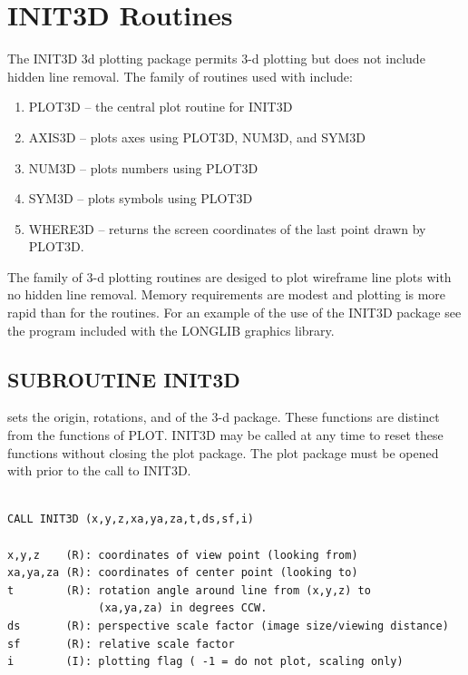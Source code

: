 \documentclass[11pt]{report}
\begin{document}
\section{INIT3D Routines}

The INIT3D 3d plotting package permits 3-d plotting but does not include
hidden line removal.
The family of routines used with  include:

\begin{enumerate}
\item PLOT3D -- the central plot routine for INIT3D
\item AXIS3D -- plots axes using PLOT3D, NUM3D, and SYM3D
\item NUM3D -- plots numbers using PLOT3D
\item SYM3D -- plots symbols using PLOT3D
\item WHERE3D -- returns the screen coordinates of the last point
drawn by PLOT3D.
\end{enumerate}

The  family of 3-d plotting routines are desiged to plot
wireframe line plots with no hidden line removal.  Memory requirements
are modest and plotting is more rapid than for the  routines.
For an example of the use of the INIT3D package see the 
program included with the LONGLIB graphics library.

\subsection{SUBROUTINE INIT3D}

 sets the  origin, rotations, and   of
the 3-d package.  These functions are distinct from the functions of
PLOT.  INIT3D may be called at any time to reset these functions without
closing the plot package.  The plot package must be opened with 
prior to the call to INIT3D.
\begin{verbatim}

CALL INIT3D (x,y,z,xa,ya,za,t,ds,sf,i)

x,y,z    (R): coordinates of view point (looking from)
xa,ya,za (R): coordinates of center point (looking to)
t        (R): rotation angle around line from (x,y,z) to
              (xa,ya,za) in degrees CCW.
ds       (R): perspective scale factor (image size/viewing distance)
sf       (R): relative scale factor
i        (I): plotting flag ( -1 = do not plot, scaling only)
\end{verbatim}
\end{document}
